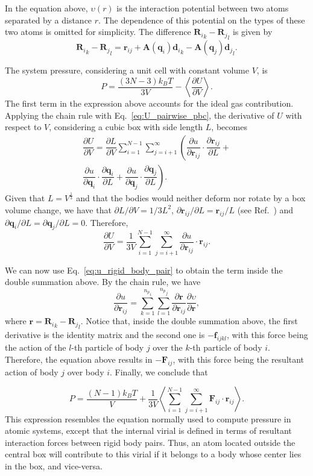 \documentclass[aip,jcp,reprint,amsmath,amssymb]{revtex4-1}
\newcommand{\mt}[1]{\boldsymbol{\mathbf{#1}}}           %
\newcommand{\vt}[1]{\boldsymbol{\mathbf{#1}}}           %
\newcommand{\diff}[2]{\dfrac{\partial #1}{\partial #2}} %
\begin{document}
In the equation above, $\upsilon(r)$ is the interaction potential between two atoms separated by a distance $r$. The dependence of this potential on the types of these two atoms is omitted for simplicity. The difference ${{\vt R}_i}_k - {{\vt R}_j}_l$ is given by
\[
{{\vt R}_i}_k - {{\vt R}_j}_l = {\vt r}_{ij} + {\mt A}({\vt q}_i){{\vt d}_i}_k - {\mt A}({\vt q}_j){{\vt d}_j}_l.
\]

The system pressure, considering a unit cell with constant volume $V$, is\cite{Louwerse2006,Tuckerman2010}
\[
P = \frac{(3N-3) k_B T}{3V} - \left\langle \diff{U}{V} \right\rangle.
\]
The first term in the expression above accounts for the ideal gas contribution. Applying the chain rule with Eq.~\ref{eq:U_pairwise_pbc}, the derivative of $U$ with respect to $V$, considering a cubic box with side length $L$, becomes
\begin{equation}
\begin{split}
\diff{U}{V} = \diff{L}{V} \sum_{i=1}^{N-1} \sum_{j=i+1}^{\infty} \left( \diff{u}{{\vt r}_{ij}} \cdot \diff{{\vt r}_{ij}}{L} + \right. \\ \left. \diff{u}{{\vt q}_i} \cdot \diff{{\vt q}_i}{L} + \diff{u}{{\vt q}_j} \cdot \diff{{\vt q}_j}{L}\right).
\end{split}
\end{equation}
Given that $L = V^\frac{1}{3}$ and that the bodies would neither deform nor rotate by a box volume change, we have that $\partial L / \partial V = 1/3L^2$, $\partial {\vt r}_{ij}/\partial L = {\vt r}_{ij}/L$ (see Ref.~) and $\partial {\vt q}_i / \partial L = \partial {\vt q}_j / \partial L = 0$. Therefore,
\[
\diff{U}{V} = \frac{1}{3V} \sum_{i=1}^{N-1} \sum_{j=i+1}^{\infty} \diff{u}{{\vt r}_{ij}} \cdot {\vt r}_{ij}.
\]

We can now use Eq.~\ref{eq:u_rigid_body_pair} to obtain the term inside the double summation above. By the chain rule, we have
\[
\diff{u}{{\vt r}_{ij}} = \sum_{k=1}^{{n_p}_i} \sum_{l=1}^{{n_p}_j} \diff{\vt r}{\vt r_{ij}} \diff{\upsilon}{\vt r},
\]
where $\vt r = {{\vt R}_i}_k - {{\vt R}_j}_l$. Notice that, inside the double summation above, the first derivative is the identity matrix and the second one is $-{\vt f}_{ijkl}$, with this force being the action of the $l$-th particle of body $j$ over the $k$-th particle of body $i$. Therefore, the equation above results in $-\vt F_{ij}$, with this force being the resultant action of body $j$ over body $i$. Finally, we conclude that

\begin{equation}
\label{eq:pressure}
P = \frac{(N-1) k_B T}{V} + \frac{1}{3V} \left\langle \sum_{i=1}^{N-1} \sum_{j=i+1}^{\infty}{\vt F}_{ij} \cdot {\vt r}_{ij}  \right\rangle.
\end{equation}
This expression resembles the equation normally used to compute pressure in atomic systems, except that the internal virial is defined in terms of resultant interaction forces between rigid body pairs. Thus, an atom located outside the central box will contribute to this virial if it belongs to a body whose center lies in the box, and vice-versa.
\end{document}
